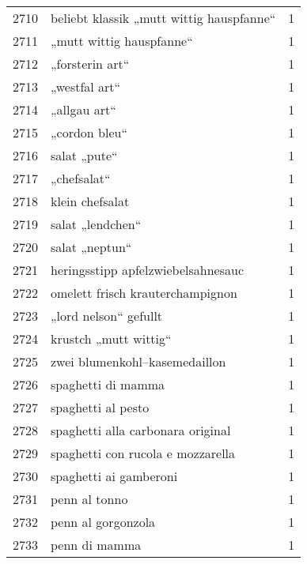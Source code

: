 \begin{tabular}{llr}
2710 &           beliebt klassik „mutt wittig hauspfanne“ &      1 \\
2711 &                           „mutt wittig hauspfanne“ &      1 \\
2712 &                                    „forsterin art“ &      1 \\
2713 &                                      „westfal art“ &      1 \\
2714 &                                       „allgau art“ &      1 \\
2715 &                                      „cordon bleu“ &      1 \\
2716 &                                       salat „pute“ &      1 \\
2717 &                                        „chefsalat“ &      1 \\
2718 &                                    klein chefsalat &      1 \\
2719 &                                   salat „lendchen“ &      1 \\
2720 &                                     salat „neptun“ &      1 \\
2721 &                 heringsstipp apfelzwiebelsahnesauc &      1 \\
2722 &                   omelett frisch krauterchampignon &      1 \\
2723 &                              „lord nelson“ gefullt &      1 \\
2724 &                              krustch „mutt wittig“ &      1 \\
2725 &                      zwei blumenkohl–kasemedaillon &      1 \\
2726 &                                 spaghetti di mamma &      1 \\
2727 &                                 spaghetti al pesto &      1 \\
2728 &                  spaghetti alla carbonara original &      1 \\
2729 &                  spaghetti con rucola e mozzarella &      1 \\
2730 &                             spaghetti ai gamberoni &      1 \\
2731 &                                      penn al tonno &      1 \\
2732 &                                 penn al gorgonzola &      1 \\
2733 &                                      penn di mamma &      1 \\

\end{tabular}
